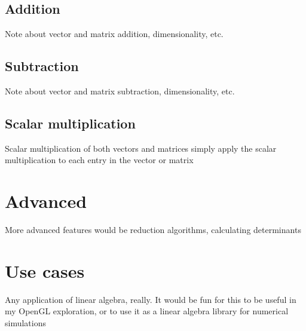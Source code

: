\documentclass[a4]{article}
\begin{document}
\subsection{Addition}
Note about vector and matrix addition, dimensionality, etc.

\subsection{Subtraction}
Note about vector and matrix subtraction, dimensionality, etc.

\subsection{Scalar multiplication}
Scalar multiplication of both vectors and matrices simply apply the scalar multiplication to each entry in the vector or matrix


\section{Advanced}
More advanced features would be reduction algorithms, calculating determinants

\section{Use cases}
Any application of linear algebra, really. It would be fun for this to be useful in my OpenGL exploration, or to use it as a linear algebra library for numerical simulations
\end{document}

